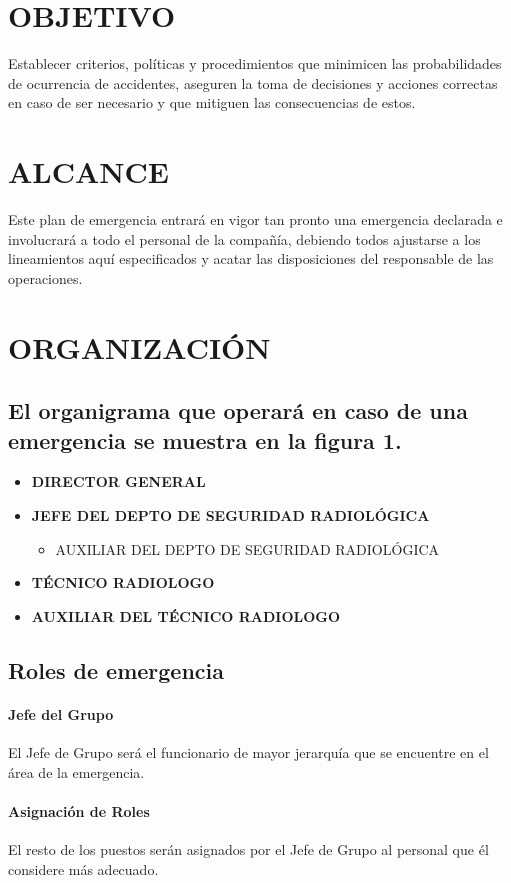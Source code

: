 
\section*{OBJETIVO}

Establecer criterios, políticas y procedimientos que minimicen las probabilidades de ocurrencia de accidentes, aseguren la toma de decisiones y acciones correctas en caso de ser necesario y que mitiguen las consecuencias de estos.

\section*{ALCANCE}

Este plan de emergencia entrará en vigor tan pronto una emergencia declarada e involucrará a todo el personal de la compañía, debiendo todos ajustarse a los lineamientos aquí especificados y acatar las disposiciones del responsable de las operaciones.

\section*{ORGANIZACIÓN}

\subsection*{El organigrama que operará en caso de una emergencia se muestra en la figura 1.}

\begin{itemize}
	\item \textbf{DIRECTOR GENERAL}
	\item \textbf{JEFE DEL DEPTO DE SEGURIDAD RADIOLÓGICA}
		\begin{itemize}
			\item AUXILIAR DEL DEPTO DE SEGURIDAD RADIOLÓGICA
		\end{itemize}
	\item \textbf{TÉCNICO RADIOLOGO}
	\item \textbf{AUXILIAR DEL TÉCNICO RADIOLOGO}
\end{itemize}

\subsection*{Roles de emergencia}

\paragraph{Jefe del Grupo}
El Jefe de Grupo será el funcionario de mayor jerarquía que se encuentre en el área de la emergencia.

\paragraph{Asignación de Roles}
El resto de los puestos serán asignados por el Jefe de Grupo al personal que él considere más adecuado.